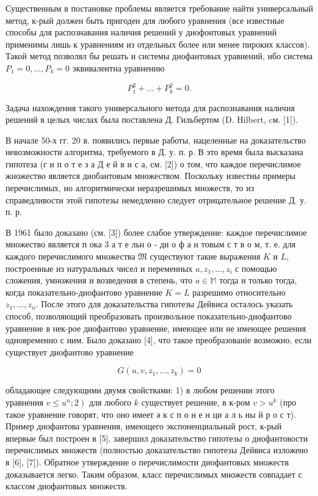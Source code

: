 \documentclass[10pt]{article}
\begin{document}
Существенным в постановке проблемы является требование найти универсальный метод, к-рый должен быть пригоден для любого уравнения (все известные способы для распознавания наличия решений у диофонтовых уравнений применимы лишь к уравнениям из отдельных более или менее пироких классов). Такой метод позволял бы решать и системы диофантовых уравнений, ибо система $P_{1}=0, \ldots, P_{k}=0$ эквивалентна уравнению



\[

P_{1}^{2}+\ldots+P_{k}^{2}=0 .

\]



Задача нахождения такого универсального метода для распознавания наличия решений в целых числах была поставлена Д. Гильбертом (D. Hilbert, cм. [1]).



В начале 50-х гг. 20 в. появились первые работы, нацеленные на доказательство невозможности алгоритма, требуемого в Д. у. п. р. В это время была высказана гипотеза (г и п о т е з а Д е й в и с а, см. [2]) о том, что каждое перечислимое жножество является диобантовым множеством. Поскольку известны примеры перечислимых, но алгоритмически неразрешимых множеств, то из справедливости этой гипотезы немедленно следует отрицательное решение Д. у. п. р.



В 1961 было доказано (см. [3]) более слабое утверждение: каждое перечислимое множество является п ока 3 а т е льн о - ди о ф а н товым с т в о м, т. е. для каждого перечислимого множества $\mathfrak{M}$ существуют такие выражения $K$ и $L$, построенные из натуральных чисел и переменных $a, z_{1}, \ldots, z_{\imath}$ с помощью сложения, умножения и возведения в степень, что $a \in \mathbb{M}$ тогда и только тогда, когда показательно-диофантово уравнение $K=L$ разрешимо относительно $z_{1}, \ldots, z_{n}$. После этого для доказательства гипотезы Дейвиса осталось указать способ, позволяющий преобразовать произвольное показательно-диофантово уравнение в нек-рое диофантово уравнение, имеющее или не имеющее решения одновременно с ним. Было доказано [4], что такое преобразованіе возможно, если существует диофантово уравнение



\[

G\left(u, v, z_{1}, \ldots, z_{k}\right)=0

\]



обладающее следующими двумя свойствами: 1) в любом решении этого уравнения $\left.v \leqslant u^{n} ; 2\right)$ для любого $k$ существует решение, в к-ром $v>u^{k}$ (про такое уравнение говорят, что оно имеет ә к с п о н е н ци а л ь ны й р о с т). Пример диофантова уравнения, имеющего экспоненциальный рост, к-рый впервые был построен в [5], завершил доказательство гипотезы о диофантовости перечислимых множеств (полностью доказательство гипотезы Дейвиса изложено в [6], [7]). Обратное утверждение о перечислимости диофантовых множеств доказывается легко. Таким образом, класс перечислимых множеств совпадает с классом диофантовых множеств.
\end{document}
